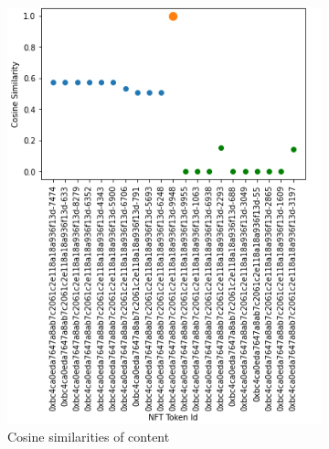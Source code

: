 \begin{figure}[h!]
     \centering
     \begin{subfigure}[b]{0.45\textwidth}
         \centering
         \includegraphics[width=\textwidth]{images/Testing/Cosine Similarities of Recommended NFTs (Trait Content Based + Total Rarity Recomendations Models).png}
         \caption{Cosine similarities of content}
         \label{fig:1-1}
     \end{subfigure}
     \hfill
     \begin{subfigure}[b]{0.45\textwidth}
         \centering

\end{subfigure}
\end{figure}

